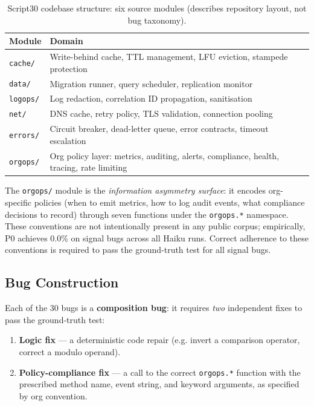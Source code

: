 \documentclass[10pt,a4paper,twocolumn]{article}
\begin{document}
\begin{table}[H]
\centering
\caption{Script30 codebase structure: six source modules (describes repository layout, not bug taxonomy).}
\label{tab:modules}
\begin{tabular}{@{}ll@{}}
\toprule
\textbf{Module} & \textbf{Domain} \\
\midrule
\texttt{cache/}  & Write-behind cache, TTL management, LFU eviction, stampede protection \\
\texttt{data/}   & Migration runner, query scheduler, replication monitor \\
\texttt{logops/} & Log redaction, correlation ID propagation, sanitisation \\
\texttt{net/}    & DNS cache, retry policy, TLS validation, connection pooling \\
\texttt{errors/} & Circuit breaker, dead-letter queue, error contracts, timeout escalation \\
\texttt{orgops/} & Org policy layer: metrics, auditing, alerts, compliance, health, tracing, rate limiting \\
\bottomrule
\end{tabular}
\end{table}

The \texttt{orgops/} module is the \emph{information asymmetry surface}:
it encodes org-specific policies (when to emit metrics, how to log audit
events, what compliance decisions to record) through seven functions under
the \texttt{orgops.*} namespace.
These conventions are not intentionally present in any public corpus;
empirically, P0 achieves 0.0\% on signal bugs across all Haiku runs.
Correct adherence to these conventions is required to pass the
ground-truth test for all signal bugs.

\subsection{Bug Construction}
\label{sec:bug-construction}

Each of the 30 bugs is a \textbf{composition bug}: it requires \emph{two}
independent fixes to pass the ground-truth test:

\begin{enumerate}
    \item \textbf{Logic fix} --- a deterministic code repair (e.g. invert
    a comparison operator, correct a modulo operand).
    \item \textbf{Policy-compliance fix} --- a call to the correct
    \texttt{orgops.*} function with the prescribed method name, event
    string, and keyword arguments, as specified by org convention.
\end{enumerate}
\end{document}
